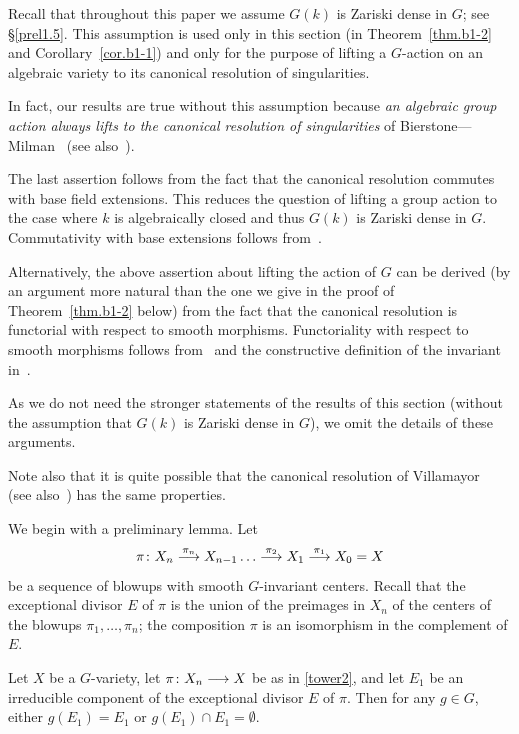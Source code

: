 \begin{remark}  \label{rem.thm.b1-2}
Recall that throughout this paper we assume $G(k)$ is Zariski 
dense in $G$; see \S\ref{prel1.5}. This assumption is used only
in this section (in Theorem~\ref{thm.b1-2} and
Corollary~\ref{cor.b1-1})
and only for the purpose of lifting a $G$-action 
on an algebraic variety to its canonical resolution of singularities.
 
In fact, our results
are true without this assumption because {\em an algebraic group action
always lifts to the canonical resolution of singularities}
of Bierstone---Milman~\cite{bm} (see also~\cite{bm1}).

The last assertion follows from the fact that the canonical 
resolution commutes with base field extensions. This
reduces the question of lifting a group action to the case
where $k$ is algebraically closed and thus $G(k)$ is Zariski dense in $G$.
Commutativity with base extensions follows from~\cite[Remark~3.8]{bm}.

Alternatively, the above assertion about lifting the action of $G$
can be derived (by an argument more natural than the one
we give in the proof of Theorem~\ref{thm.b1-2} below)
from the fact that the canonical resolution is functorial 
with respect to smooth morphisms. Functoriality
with respect to smooth morphisms
follows from~\cite[Remark~1.5]{bm} and the constructive
definition of the invariant in~\cite[\S\S4, 6]{bm}.

As we do not need the stronger statements of the results of this section
(without the assumption that $G(k)$ is Zariski dense in $G$), we omit
the details of these arguments.

Note also that it is quite possible that the canonical resolution of
Villamayor~\cite{Vil2} (see also~\cite{Vil}) has the same properties.
\end{remark}

We begin with a preliminary lemma.
Let
\begin{equation} \label{tower2}
\pi\colon X_n \stackrel{\pi_n}{\longrightarrow} X_{n-1}
\dots \stackrel{\pi_2}{\longrightarrow} X_1 \stackrel{\pi_1}{\longrightarrow} X_0 = X 
\end{equation}
be a sequence of blowups with smooth $G$-invariant centers.
Recall that the exceptional divisor $E$ of $\pi$ is the
union of the preimages in $X_n$ of the centers of the blowups
$\pi_1,\dots,\pi_n$; the composition $\pi$ is an isomorphism in the complement
of $E$.
 
\begin{lem} \label{lem4.1-1}
Let $X$ be a $G$-variety, let $\pi\colon X_n \longrightarrow X$ be as in \eqref{tower2},
and let $E_1$ be an irreducible component of the exceptional divisor $E$ of
$\pi$.
Then for any $g \in G$, either $g(E_1) = E_1$ or $g(E_1) \cap E_1 = \emptyset$.
\end{lem}

